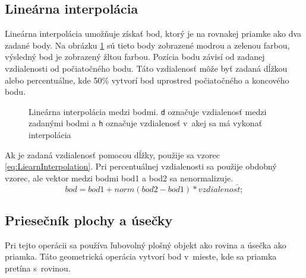 \subsection*{Lineárna interpolácia}
Lineárna interpolácia umožňuje získať bod, ktorý je na rovnakej priamke ako dva zadané body. Na obrázku \ref{fig:PointLinearInterpolation} sú tieto body zobrazené modrou a zelenou farbou, výsledný bod je zobrazený žltou farbou. Pozícia bodu závisí od zadanej vzdia\-le\-nos\-ti od počiatočného bodu. Táto vzdia\-le\-nosť môže byť zadaná dĺžkou alebo percentuálne, kde 50\% vytvorí bod uprostred počiatočného a koncového bodu. 




\begin{figure}[H]
	\centering
	\caption{Lineárna interpolácia medzi bodmi.  \texttt{d} označuje vzdialenosť medzi zadanými bodmi a  \texttt{h} označuje vzdialenosť v~akej sa má vykonať interpolácia }
	\label{fig:PointLinearInterpolation}
\end{figure}

Ak je zadaná vzdialenosť pomocou dĺžky, použije sa vzorec \ref{eq:LiearnInterpolation}. Pri percentuálnej vzdialenosti sa použije obdobný vzorec, ale vektor medzi bodmi bod1 a bod2 sa nenormalizuje.
\begin{equation}
    bod = bod1 + norm(bod2 - bod1) * vzdialenos\check{t};
	\label{eq:LiearnInterpolation}
\end{equation}


\subsection*{Priesečník plochy a úsečky}

Pri tejto operácii sa používa ľubovolný plošný objekt ako rovina a úsečka ako priamka. Táto geometrická operácia vytvorí bod v~mieste, kde sa priamka pretína s~rovinou. 



